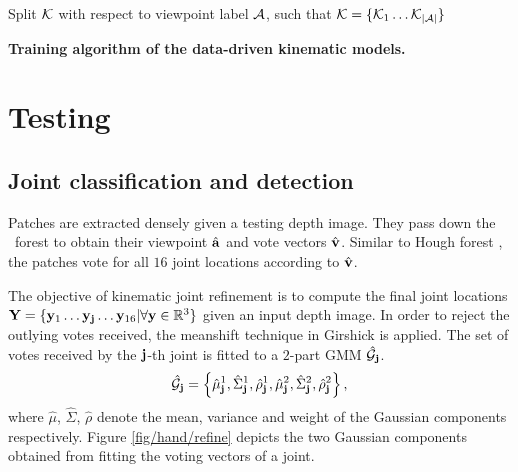 \begin{algorithm}
	Split $\mathcal{K}$ with respect to viewpoint label $\mathcal{A}$, such that $\mathcal{K} = \{ \mathcal{K}_{1} \dots \mathcal{K}_{|\mathcal{A}|} \}$\\
	\caption{\textbf{Training algorithm of the data-driven kinematic models.}}
	\label{alg/hand/kinematic}
\end{algorithm}

\section{Testing} 

\subsection{Joint classification and detection} 
\label{sec/hand/strtesting} 

Patches are extracted densely given a testing depth image. They pass down the \STR\ forest to obtain their viewpoint $\hat{\mathbf{a}}$ and vote vectors $\hat{\mathbf{v}}$. Similar to Hough forest \cite{Gall2011}, the patches vote for all $16$ joint locations according to $\hat{\mathbf{v}}$.  

The objective of kinematic joint refinement is to compute the final joint locations $\mathbf{Y} = \{ \mathbf{y}_{1} \dots \mathbf{y}_{\mathbf{j}} \dots \mathbf{y}_{16} | \forall \mathbf{y} \in \mathbb{R}^{3}\}$ given an input depth image. 
In order to reject the outlying votes received, the meanshift technique in Girshick \etal  \cite{Girshick2011} is applied.     
The set of votes received by the $\mathbf{j}$-th joint is fitted to a $2$-part GMM $\hat{\mathcal{G}}_{\mathbf{j}}$. 
\begin{equation}
	\hat{\mathcal{G}}_{\mathbf{j}} = \left\{ \hat{\mu}_{\mathbf{j}}^{1}, \hat{\Sigma}_{\mathbf{j}}^{1}, \hat{\rho}_{\mathbf{j}}^{1}, \hat{\mu}_{\mathbf{j}}^{2}, \hat{\Sigma}_{\mathbf{j}}^{2}, \hat{\rho}_{\mathbf{j}}^{2} \right\},
\end{equation}
where $\hat{\mu}$, $\hat{\Sigma}$, $\hat{\rho}$ denote the mean, variance and weight of the Gaussian components respectively. Figure \ref{fig/hand/refine} depicts the two Gaussian components obtained from fitting the voting vectors of a joint.  

